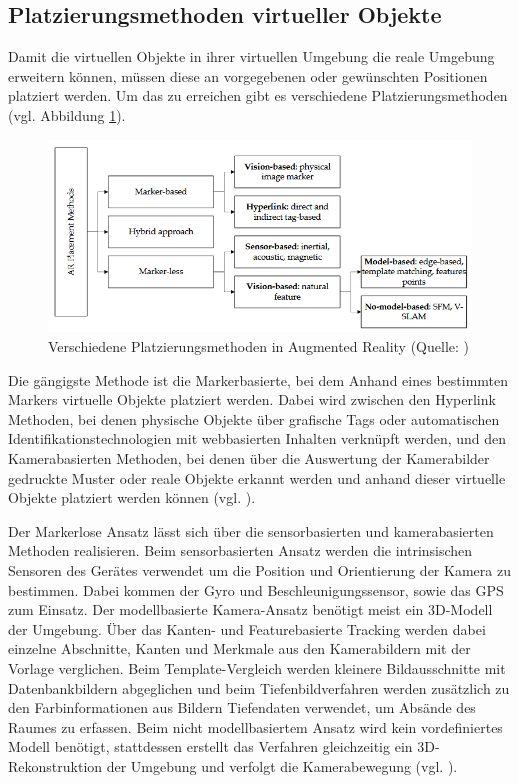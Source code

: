 \subsection{Platzierungsmethoden virtueller Objekte}
Damit die virtuellen Objekte in ihrer virtuellen Umgebung die reale Umgebung erweitern können, müssen diese an vorgegebenen oder gewünschten Positionen platziert werden. Um das zu erreichen gibt es verschiedene Platzierungsmethoden (vgl. Abbildung \ref{fig:placement-ar}).

\begin{figure}[ht]
\centering
\includegraphics[width=1\linewidth]{content/pictures/placement-methods.PNG}
\caption{Verschiedene Platzierungsmethoden in Augmented Reality (Quelle: \citealp[S. 3]{el_barhoumi_assessment_2022})}
\label{fig:placement-ar}
\end{figure}

Die gängigste Methode ist die Markerbasierte, bei dem Anhand eines bestimmten Markers virtuelle Objekte platziert werden. Dabei wird zwischen den Hyperlink Methoden, bei denen physische Objekte über grafische Tags oder automatischen Identifikationstechnologien mit webbasierten Inhalten verknüpft werden, und den Kamerabasierten Methoden, bei denen über die Auswertung der Kamerabilder gedruckte Muster oder reale Objekte erkannt werden und anhand dieser virtuelle Objekte platziert werden können (vgl. \citealp[S. 3f]{el_barhoumi_assessment_2022}). 

Der Markerlose Ansatz lässt sich über die sensorbasierten und kamerabasierten Methoden realisieren. Beim sensorbasierten Ansatz werden die intrinsischen Sensoren des Gerätes verwendet um die Position und Orientierung der Kamera zu bestimmen. Dabei kommen der Gyro und Beschleunigungssensor, sowie das GPS zum Einsatz. Der modellbasierte Kamera-Ansatz benötigt meist ein \ac{3D}-Modell der Umgebung. Über das Kanten- und Featurebasierte Tracking werden dabei einzelne Abschnitte, Kanten und Merkmale aus den Kamerabildern mit der Vorlage verglichen. Beim Template-Vergleich werden kleinere Bildausschnitte mit Datenbankbildern abgeglichen und beim Tiefenbildverfahren werden zusätzlich zu den Farbinformationen aus Bildern Tiefendaten verwendet, um Absände des Raumes zu erfassen.
Beim nicht modellbasiertem Ansatz wird kein vordefiniertes Modell benötigt, stattdessen erstellt das Verfahren gleichzeitig ein \ac{3D}-Rekonstruktion der Umgebung und verfolgt die Kamerabewegung (vgl. \citealp[S. 4f]{el_barhoumi_assessment_2022}).

